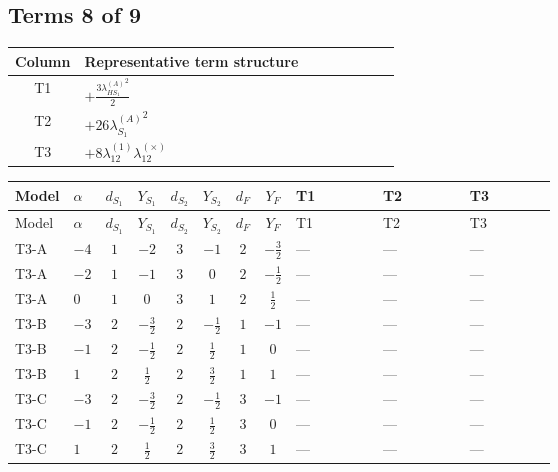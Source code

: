 \documentclass[8pt]{article}
\begin{document}
\begin{landscape}
\subsection*{Terms 8 of 9}
\begin{center}
\begin{tabular}{@{}c >{\raggedright\arraybackslash}p{0.82\linewidth}@{}}
\toprule
Column & Representative term structure \\
\midrule
T1 & \(\displaystyle +\frac{3 {\lambda_{HS_1}^{(A)}}^2}{2}\) \\
\midrule
T2 & \(\displaystyle +26 {\lambda_{S_1}^{(A)}}^2\) \\
\midrule
T3 & \(\displaystyle +8 {\lambda_{12}^{(1)}} {\lambda_{12}^{(\times)}}\) \\
\midrule
\bottomrule
\end{tabular}
\end{center}
\smallskip
\tiny
\begin{longtable}{@{}llcccccc >{\raggedright\arraybackslash}p{0.21\linewidth} >{\raggedright\arraybackslash}p{0.21\linewidth} >{\raggedright\arraybackslash}p{0.21\linewidth}@{}}
\toprule
Model & $\alpha$ & $d_{S_1}$ & $Y_{S_1}$ & $d_{S_2}$ & $Y_{S_2}$ & $d_F$ & $Y_F$ & T1 & T2 & T3 \\
\midrule
\endfirsthead
\toprule
Model & $\alpha$ & $d_{S_1}$ & $Y_{S_1}$ & $d_{S_2}$ & $Y_{S_2}$ & $d_F$ & $Y_F$ & T1 & T2 & T3 \\
\midrule
\endhead
T3-A & $-4$ & $1$ & $-2$ & $3$ & $-1$ & $2$ & $-\frac{3}{2}$ & --- & --- & --- \\
\midrule
T3-A & $-2$ & $1$ & $-1$ & $3$ & $0$ & $2$ & $-\frac{1}{2}$ & --- & --- & --- \\
\midrule
T3-A & $0$ & $1$ & $0$ & $3$ & $1$ & $2$ & $\frac{1}{2}$ & --- & --- & --- \\
\midrule
T3-B & $-3$ & $2$ & $-\frac{3}{2}$ & $2$ & $-\frac{1}{2}$ & $1$ & $-1$ & --- & --- & --- \\
\midrule
T3-B & $-1$ & $2$ & $-\frac{1}{2}$ & $2$ & $\frac{1}{2}$ & $1$ & $0$ & --- & --- & --- \\
\midrule
T3-B & $1$ & $2$ & $\frac{1}{2}$ & $2$ & $\frac{3}{2}$ & $1$ & $1$ & --- & --- & --- \\
\midrule
T3-C & $-3$ & $2$ & $-\frac{3}{2}$ & $2$ & $-\frac{1}{2}$ & $3$ & $-1$ & --- & --- & --- \\
\midrule
T3-C & $-1$ & $2$ & $-\frac{1}{2}$ & $2$ & $\frac{1}{2}$ & $3$ & $0$ & --- & --- & --- \\
\midrule
T3-C & $1$ & $2$ & $\frac{1}{2}$ & $2$ & $\frac{3}{2}$ & $3$ & $1$ & --- & --- & --- \\

\end{longtable}
\end{landscape}
\end{document}
